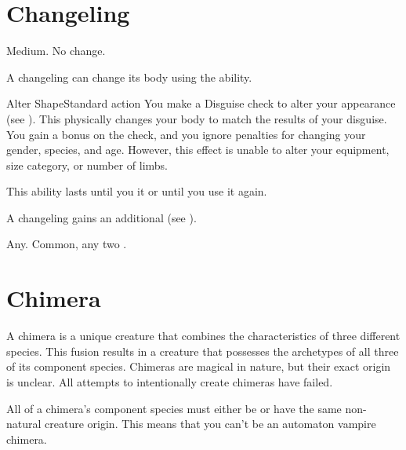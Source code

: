 \section{Changeling}

   Medium.
   No change.
  \begin{raggeditemize}
     A changeling can change its body using the  ability.
    \begin{activeability}{Alter Shape}{Standard action}
        \rankline
        You make a Disguise check to alter your appearance (see ).
        This physically changes your body to match the results of your disguise.
        You gain a  bonus on the check, and you ignore penalties for changing your gender, species, and age.
        However, this effect is unable to alter your equipment, size category, or number of limbs.

        This ability lasts until you  it or until you use it again.
      \end{activeability}
     A changeling gains an additional  (see ).
  \end{raggeditemize}
   Any.
   Common, any two .

\section{Chimera}
  A chimera is a unique creature that combines the characteristics of three different species.
  This fusion results in a creature that possesses the archetypes of all three of its component species.
  Chimeras are magical in nature, but their exact origin is unclear.
  All attempts to intentionally create chimeras have failed.

  All of a chimera's component species must either be  or have the same non-natural creature origin.
  This means that you can't be an automaton vampire chimera.

